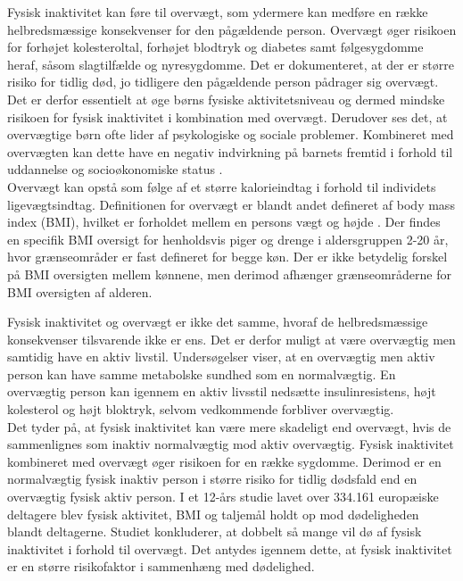 Fysisk inaktivitet kan føre til overvægt, som ydermere kan medføre en række helbredsmæssige konsekvenser for den pågældende person. Overvægt øger risikoen for forhøjet kolesteroltal, forhøjet blodtryk og diabetes samt følgesygdomme heraf, såsom slagtilfælde og nyresygdomme. Det er dokumenteret, at der er større risiko for tidlig død, jo tidligere den pågældende person pådrager sig overvægt. Det er derfor essentielt at øge børns fysiske aktivitetsniveau og dermed mindske risikoen for fysisk inaktivitet i kombination med overvægt. \citep{Nestle2014} Derudover ses det, at overvægtige børn ofte lider af psykologiske og sociale problemer. Kombineret med overvægten kan dette have en negativ indvirkning på barnets fremtid i forhold til uddannelse og socioøkonomiske status \citep{Academic2016}. \\
Overvægt kan opstå som følge af et større kalorieindtag i forhold til individets ligevægtsindtag. \citep{Nestle2014} Definitionen for overvægt er blandt andet defineret af body mass index (BMI), hvilket er forholdet mellem en persons vægt og højde \citep{Academic2016}. Der findes en specifik BMI oversigt for henholdsvis piger og drenge i aldersgruppen 2-20 år, hvor grænseområder er fast defineret for begge køn. Der er ikke betydelig forskel på BMI oversigten mellem kønnene, men derimod afhænger grænseområderne for BMI oversigten af alderen. \citep{DiseaseControl2015}

Fysisk inaktivitet og overvægt er ikke det samme, hvoraf de helbredsmæssige konsekvenser tilsvarende ikke er ens. Det er derfor muligt at være overvægtig men samtidig have en aktiv livstil. \citep{Kiens2007} Undersøgelser viser, at en overvægtig men aktiv person kan have samme metabolske sundhed som en normalvægtig. En overvægtig person kan igennem en aktiv livsstil nedsætte insulinresistens, højt kolesterol og højt bloktryk, selvom vedkommende forbliver overvægtig.~\citep{Lunau2012,Marcelino2012} \\
Det tyder på, at fysisk inaktivitet kan være mere skadeligt end overvægt, hvis de sammenlignes som inaktiv normalvægtig mod aktiv overvægtig. Fysisk inaktivitet kombineret med overvægt øger risikoen for en række sygdomme. Derimod er en normalvægtig fysisk inaktiv person i større risiko for tidlig dødsfald end en overvægtig fysisk aktiv person. I et 12-års studie lavet over 334.161 europæiske deltagere blev fysisk aktivitet, BMI og taljemål holdt op mod dødeligheden blandt deltagerne. Studiet konkluderer, at dobbelt så mange vil dø af fysisk inaktivitet i forhold til overvægt. Det antydes igennem dette, at fysisk inaktivitet er en større risikofaktor i sammenhæng med dødelighed.~\citep{Ekelund2015} 